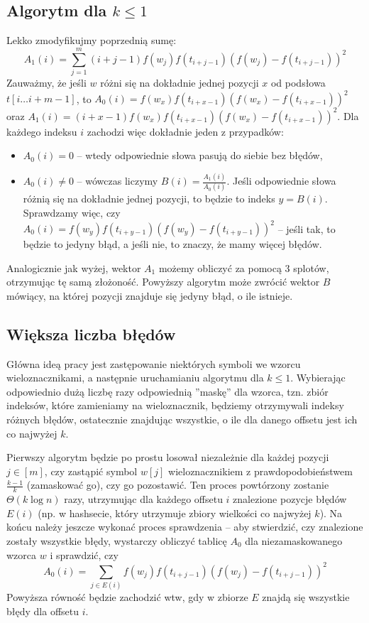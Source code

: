 \documentclass[a4paper,12pt]{article}
\theoremstyle{definition}
\begin{document}
\subsection{Algorytm dla $k\le1$}
Lekko zmodyfikujmy poprzednią sumę:
\[A_1(i) = \sum_{j=1}^m (i+j-1)f(w_j) f(t_{i+j-1})(f(w_j) - f(t_{i+j-1}))^2\]
Zauważmy, że jeśli $w$ różni się na dokładnie jednej pozycji $x$ od podsłowa $t[i\dots i+m-1]$, to $A_0(i) = f(w_x) f(t_{i+x-1})(f(w_x) - f(t_{i+x-1}))^2$ oraz $A_1(i) = (i+x-1)f(w_x) f(t_{i+x-1})(f(w_x) - f(t_{i+x-1}))^2$. Dla każdego indeksu $i$ zachodzi więc dokładnie jeden z przypadków:
\begin{itemize}
    \item $A_0(i) = 0$ -- wtedy odpowiednie słowa pasują do siebie bez błędów,
    \item $A_0(i) \ne 0$ -- wówczas liczymy $B(i) = \frac{A_1(i)}{A_0(i)}$. Jeśli odpowiednie słowa różnią się na dokładnie jednej pozycji, to będzie to indeks $y = B(i)$. Sprawdzamy więc, czy $A_0(i) = f(w_y) f(t_{i+y-1})(f(w_y) - f(t_{i+y-1}))^2$ -- jeśli tak, to będzie to jedyny błąd, a jeśli nie, to znaczy, że mamy więcej błędów.
\end{itemize}
Analogicznie jak wyżej, wektor $A_1$ możemy obliczyć za pomocą 3 splotów, otrzymując tę samą złożoność. Powyższy algorytm może zwrócić wektor $B$ mówiący, na której pozycji znajduje się jedyny błąd, o ile istnieje.

\subsection{Większa liczba błędów}
Główna ideą pracy jest zastępowanie niektórych symboli we wzorcu wieloznacznikami, a następnie uruchamianiu algorytmu dla $k \le 1$. Wybierając odpowiednio dużą liczbę razy odpowiednią ''maskę'' dla wzorca, tzn. zbiór indeksów, które zamieniamy na wieloznacznik, będziemy otrzymywali indeksy różnych błędów, ostatecznie znajdując wszystkie, o ile dla danego offsetu jest ich co najwyżej $k$.

Pierwszy algorytm będzie po prostu losował niezależnie dla każdej pozycji $j\in[m]$, czy zastąpić symbol $w[j]$ wieloznacznikiem z prawdopodobieństwem $\frac{k-1}{k}$ (zamaskować go), czy go pozostawić. Ten proces powtórzony zostanie $\Theta(k \log n)$ razy, utrzymując dla każdego offsetu $i$ znalezione pozycje błędów $E(i)$ (np. w hashsecie, który utrzymuje zbiory wielkości co najwyżej $k$). Na końcu należy jeszcze wykonać proces sprawdzenia --  aby stwierdzić, czy znalezione zostały wszystkie błędy, wystarczy obliczyć tablicę $A_0$ dla niezamaskowanego wzorca $w$ i sprawdzić, czy 
\[A_0(i) = \sum_{j \in E(i)} f(w_j) f(t_{i+j-1})(f(w_j) - f(t_{i+j-1}))^2\]
Powyższa równość będzie zachodzić wtw, gdy w zbiorze $E$ znajdą się wszystkie błędy dla offsetu $i$.
\end{document}
